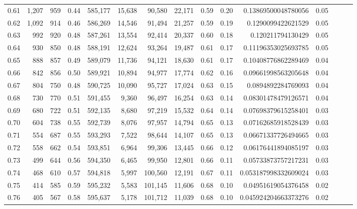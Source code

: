 \begin{tabular}{rrrrrrrrrrrrrrr}
0.61 &   1,207 &    959 &  0.44 &  585,177 &   15,638 &   90,580 &   22,171 &  0.59 &  0.20 &    0.13869500048780056 &      0.05 \\
0.62 &   1,092 &    914 &  0.46 &  586,269 &   14,546 &   91,494 &   21,257 &  0.59 &  0.19 &     0.1290099422621529 &      0.05 \\
0.63 &     992 &    920 &  0.48 &  587,261 &   13,554 &   92,414 &   20,337 &  0.60 &  0.18 &      0.120211794130429 &      0.05 \\
0.64 &     930 &    850 &  0.48 &  588,191 &   12,624 &   93,264 &   19,487 &  0.61 &  0.17 &    0.11196353025693785 &      0.05 \\
0.65 &     888 &    857 &  0.49 &  589,079 &   11,736 &   94,121 &   18,630 &  0.61 &  0.17 &    0.10408776862289469 &      0.04 \\
0.66 &     842 &    856 &  0.50 &  589,921 &   10,894 &   94,977 &   17,774 &  0.62 &  0.16 &    0.09661998563205648 &      0.04 \\
0.67 &     804 &    750 &  0.48 &  590,725 &   10,090 &   95,727 &   17,024 &  0.63 &  0.15 &     0.0894892284769093 &      0.04 \\
0.68 &     730 &    770 &  0.51 &  591,455 &    9,360 &   96,497 &   16,254 &  0.63 &  0.14 &    0.08301478479126571 &      0.04 \\
0.69 &     680 &    722 &  0.51 &  592,135 &    8,680 &   97,219 &   15,532 &  0.64 &  0.14 &    0.07698379615258401 &      0.03 \\
0.70 &     604 &    738 &  0.55 &  592,739 &    8,076 &   97,957 &   14,794 &  0.65 &  0.13 &    0.07162685918528439 &      0.03 \\
0.71 &     554 &    687 &  0.55 &  593,293 &    7,522 &   98,644 &   14,107 &  0.65 &  0.13 &    0.06671337726494665 &      0.03 \\
0.72 &     558 &    662 &  0.54 &  593,851 &    6,964 &   99,306 &   13,445 &  0.66 &  0.12 &    0.06176441894085197 &      0.03 \\
0.73 &     499 &    644 &  0.56 &  594,350 &    6,465 &   99,950 &   12,801 &  0.66 &  0.11 &    0.05733873757217231 &      0.03 \\
0.74 &     468 &    610 &  0.57 &  594,818 &    5,997 &  100,560 &   12,191 &  0.67 &  0.11 &   0.053187998332609024 &      0.03 \\
0.75 &     414 &    585 &  0.59 &  595,232 &    5,583 &  101,145 &   11,606 &  0.68 &  0.10 &    0.04951619054376458 &      0.02 \\
0.76 &     405 &    567 &  0.58 &  595,637 &    5,178 &  101,712 &   11,039 &  0.68 &  0.10 &   0.045924204663373276 &      0.02 \\

\end{tabular}
